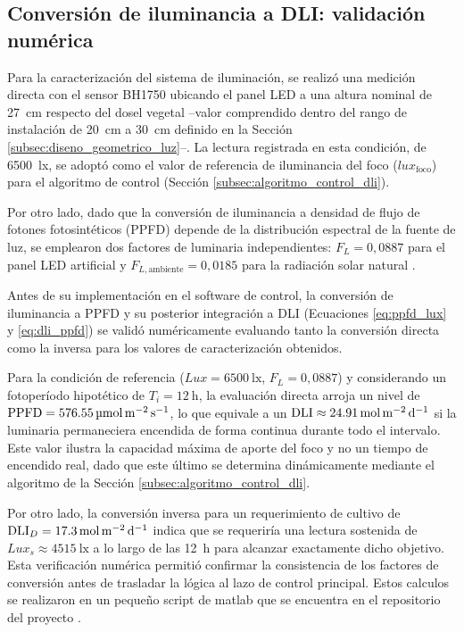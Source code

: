 \subsection{Conversión de iluminancia a DLI: validación numérica}
\label{subsec:validacion_dli}

Para la caracterización del sistema de iluminación, se realizó una medición directa con el sensor BH1750 ubicando el panel LED a una altura nominal de \SI{27}{\centi\meter} respecto del dosel vegetal --valor comprendido dentro del rango de instalación de \SI{20}{\centi\meter} a \SI{30}{\centi\meter} definido en la Sección \ref{subsec:diseno_geometrico_luz}--. La lectura registrada en esta condición, de \SI{6500}{\lux}, se adoptó como el valor de referencia de iluminancia del foco ($lux_{\text{foco}}$) para el algoritmo de control (Sección \ref{subsec:algoritmo_control_dli}).

Por otro lado, dado que la conversión de iluminancia a densidad de flujo de fotones fotosintéticos (PPFD) depende de la distribución espectral de la fuente de luz, se emplearon dos factores de luminaria independientes: $F_L = 0{,}0887$ para el panel LED artificial y $F_{L,\text{ambiente}} = 0{,}0185$ para la radiación solar natural \cite{factor_luminaria}.

Antes de su implementación en el software de control, la conversión de iluminancia a PPFD y su posterior integración a DLI (Ecuaciones \ref{eq:ppfd_lux} y \ref{eq:dli_ppfd}) se validó numéricamente evaluando tanto la conversión directa como la inversa para los valores de caracterización obtenidos.

Para la condición de referencia ($Lux = \SI{6500}{\lux}$, $F_L = 0{,}0887$) y considerando un fotoperíodo hipotético de $T_i = \SI{12}{\hour}$, la evaluación directa arroja un nivel de $\text{PPFD} = \SI{576{,}55}{\micro\mole\per\square\meter\per\second}$, lo que equivale a un $\text{DLI} \approx \SI{24{,}91}{\mole\per\square\meter\per\day}$ si la luminaria permaneciera encendida de forma continua durante todo el intervalo. Este valor ilustra la capacidad máxima de aporte del foco y no un tiempo de encendido real, dado que este último se determina dinámicamente mediante el algoritmo de la Sección \ref{subsec:algoritmo_control_dli}.

Por otro lado, la conversión inversa para un requerimiento de cultivo de $\text{DLI}_D = \SI{17{,}3}{\mole\per\square\meter\per\day}$ indica que se requeriría una lectura sostenida de $Lux_s \approx \SI{4515}{\lux}$ a lo largo de las \SI{12}{\hour} para alcanzar exactamente dicho objetivo. Esta verificación numérica permitió confirmar la consistencia de los factores de conversión antes de trasladar la lógica al lazo de control principal. Estos calculos se realizaron en un pequeño script de matlab que se encuentra en el repositorio del proyecto \cite{repo}.

